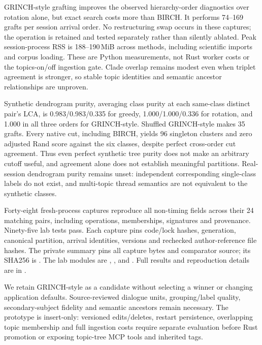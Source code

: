 \documentclass[11pt]{article}
\begin{document}
GRINCH-style grafting improves the observed hierarchy-order diagnostics over
rotation alone, but exact search costs more than BIRCH. It performs 74--169
grafts per session arrival order. No restructuring swap occurs in these captures;
the operation is retained and tested separately rather than silently ablated.
Peak session-process RSS is 188--190\,MiB across methods, including scientific
imports and corpus loading. These are Python measurements, not Rust worker costs
or the topics-on/off ingestion gate. Clade overlap remains modest even when
triplet agreement is stronger, so stable topic identities and semantic ancestor
relationships are unproven.

Synthetic dendrogram purity, averaging class purity at each same-class distinct
pair's LCA, is 0.983/0.983/0.335 for greedy, 1.000/1.000/0.336 for rotation,
and 1.000 in all three orders for GRINCH-style. Shuffled GRINCH-style makes
35 grafts. Every native cut, including BIRCH, yields 96 singleton clusters and
zero adjusted Rand score against the six classes, despite perfect cross-order
cut agreement. Thus even perfect synthetic tree purity does not make an arbitrary
cutoff useful, and agreement alone does not establish meaningful partitions.
Real-session dendrogram purity remains unset: independent corresponding
single-class labels do not exist, and multi-topic thread semantics are not
equivalent to the synthetic classes.

Forty-eight fresh-process captures reproduce all non-timing fields across their
24 matching pairs, including operations, memberships, signatures and provenance.
Ninety-five lab tests pass. Each capture pins code/lock hashes, generation,
canonical partition, arrival identities, versions and rechecked author-reference
file hashes. The private summary pins all capture bytes and comparator source;
its SHA256 is
.
The lab modules are ,
,
 and
. Full results and reproduction details
are in .

We retain GRINCH-style as a candidate without selecting a winner or changing
application defaults. Source-reviewed dialogue units, grouping/label quality,
secondary-subject fidelity and semantic ancestors remain necessary. The prototype
is insert-only: versioned edits/deletes, restart persistence, overlapping topic
membership and full ingestion costs require separate evaluation before Rust
promotion or exposing topic-tree MCP tools and inherited tags.
\end{document}
